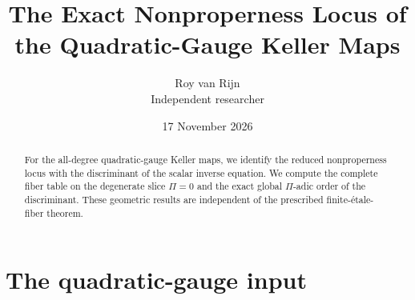 \documentclass[11pt]{article}
\title{The Exact Nonproperness Locus of the Quadratic-Gauge Keller Maps}
\author{Roy van Rijn\\{\small Independent researcher}}
\date{17 November 2026}
\numberwithin{equation}{section}
\begin{document}
\maketitle

\begin{abstract}
For the all-degree quadratic-gauge Keller maps, we identify the reduced
nonproperness locus with the discriminant of the scalar inverse equation.
We compute the complete fiber table on the degenerate slice \(\Pi=0\) and
the exact global \(\Pi\)-adic order of the discriminant.  These geometric
results are independent of the prescribed finite-\'etale-fiber theorem.
\end{abstract}

\section{The quadratic-gauge input}
\end{document}
